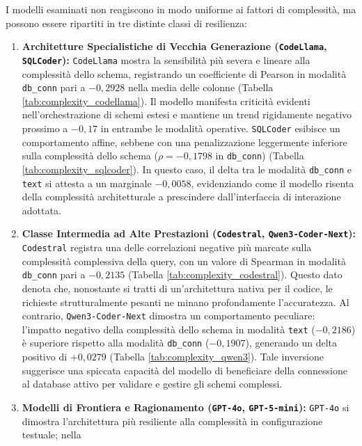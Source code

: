 I modelli esaminati non reagiscono in modo uniforme ai fattori di
complessità, ma possono essere ripartiti in tre distinte classi di
resilienza:

\begin{enumerate}
\def\labelenumi{\arabic{enumi}.}
\item
  \textbf{Architetture Specialistiche di Vecchia Generazione
  (\texttt{CodeLlama}, \texttt{SQLCoder}):} \texttt{CodeLlama} mostra la
  sensibilità più severa e lineare alla complessità dello schema,
  registrando un coefficiente di Pearson in modalità \texttt{db\_conn}
  pari a \(-0,2928\) nella media delle colonne (Tabella \ref{tab:complexity_codellama}). Il
  modello manifesta criticità evidenti nell'orchestrazione di schemi
  estesi e mantiene un trend rigidamente negativo prossimo a \(-0,17\)
  in entrambe le modalità operative. \texttt{SQLCoder} esibisce un
  comportamento affine, sebbene con una penalizzazione leggermente
  inferiore sulla complessità dello schema (\(\rho = -0,1798\) in
  \texttt{db\_conn}) (Tabella \ref{tab:complexity_sqlcoder}). In questo caso, il delta tra le
  modalità \texttt{db\_conn} e \texttt{text} si attesta a un marginale
  \(-0,0058\), evidenziando come il modello risenta della complessità
  architetturale a prescindere dall'interfaccia di interazione adottata.
\item
  \textbf{Classe Intermedia ad Alte Prestazioni (\texttt{Codestral},
  \texttt{Qwen3-Coder-Next}):} \texttt{Codestral} registra una delle
  correlazioni negative più marcate sulla complessità complessiva della
  query, con un valore di Spearman in modalità \texttt{db\_conn} pari a
  \(-0,2135\) (Tabella \ref{tab:complexity_codestral}). Questo dato denota che, nonostante si
  tratti di un'architettura nativa per il codice, le richieste
  strutturalmente pesanti ne minano profondamente l'accuratezza. Al
  contrario, \texttt{Qwen3-Coder-Next} dimostra un comportamento
  peculiare: l'impatto negativo della complessità dello schema in
  modalità \texttt{text} (\(-0,2186\)) è superiore rispetto alla
  modalità \texttt{db\_conn} (\(-0,1907\)), generando un delta positivo
  di \(+0,0279\) (Tabella \ref{tab:complexity_qwen3}). Tale inversione suggerisce una
  spiccata capacità del modello di beneficiare della connessione al
  database attivo per validare e gestire gli schemi complessi.
\item
  \textbf{Modelli di Frontiera e Ragionamento (\texttt{GPT-4o},
  \texttt{GPT-5-mini}):} \texttt{GPT-4o} si dimostra l'architettura più
  resiliente alla complessità in configurazione testuale; nella

\end{enumerate}
